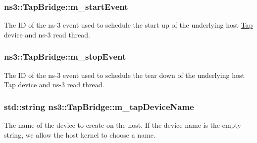 \subsubsection[{\texorpdfstring{m\+\_\+start\+Event}{m_startEvent}}]{ ns3\+::\+Tap\+Bridge\+::m\+\_\+start\+Event\hspace{0.3cm}{\ttfamily [private]}}\hypertarget{classns3_1_1TapBridge_ad3b52854cf5e27c04fcbf62030e725ec}{}\label{classns3_1_1TapBridge_ad3b52854cf5e27c04fcbf62030e725ec}
The ID of the ns-\/3 event used to schedule the start up of the underlying host \hyperlink{classns3_1_1Tap}{Tap} device and ns-\/3 read thread. 
\subsubsection[{\texorpdfstring{m\+\_\+stop\+Event}{m_stopEvent}}]{ ns3\+::\+Tap\+Bridge\+::m\+\_\+stop\+Event\hspace{0.3cm}{\ttfamily [private]}}\hypertarget{classns3_1_1TapBridge_aab982f716ac96e92e054c82334a198c4}{}\label{classns3_1_1TapBridge_aab982f716ac96e92e054c82334a198c4}
The ID of the ns-\/3 event used to schedule the tear down of the underlying host \hyperlink{classns3_1_1Tap}{Tap} device and ns-\/3 read thread. 
\subsubsection[{\texorpdfstring{m\+\_\+tap\+Device\+Name}{m_tapDeviceName}}]{\setlength{\rightskip}{0pt plus 5cm}std\+::string ns3\+::\+Tap\+Bridge\+::m\+\_\+tap\+Device\+Name\hspace{0.3cm}{\ttfamily [private]}}\hypertarget{classns3_1_1TapBridge_af255e0f837eb4dd30c4de28448f862f6}{}\label{classns3_1_1TapBridge_af255e0f837eb4dd30c4de28448f862f6}
The name of the device to create on the host. If the device name is the empty string, we allow the host kernel to choose a name. 
